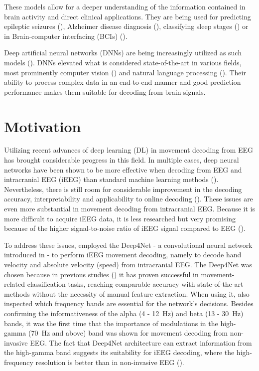 These models allow for a deeper understanding of the information contained in brain activity and direct clinical applications.
They are being used for predicting epileptic seizures (\cite{epileptic-seizures-eeg}), Alzheimer disease diagnosis (\cite{alzheimer-eeg}), classifying sleep stages (\cite{sleep-stage-alg-comparison}) or in Brain-computer interfacing (BCIs) (\cite{ecog-bci, eeg-bci}).

Deep artificial neural networks (DNNs) are being increasingly utilized as such models (\cite{Roy-2019}). DNNs elevated what is considered state-of-the-art in various fields, most prominently computer vision (\cite{dnn-computer-vision}) and natural language processing (\cite{dnn-nlp}).
Their ability to process complex data in an end-to-end manner and good prediction performance makes them suitable for decoding from brain signals. 


\section*{Motivation}
Utilizing recent advances of deep learning (DL) in movement decoding from EEG has brought considerable progress in this field.
In multiple cases, deep neural networks have been shown to be more effective when decoding from EEG and intracranial EEG (iEEG) than standard machine learning methods (\cite{Zhang-2019, lawhern-eegnet-2018, sleep-eegnet}).
Nevertheless, there is still room for considerable improvement in the decoding accuracy, interpretability and applicability to online decoding (\cite{Roy-2019}). 
These issues are even more substantial in movement decoding from intracranial EEG. 
Because it is more difficult to acquire iEEG data, it is less researched but very promising because of the higher signal-to-noise ratio of iEEG signal compared to EEG (\cite{volkova-review}). 

To address these issues, \cite{Hammer-2021} employed the Deep4Net - a convolutional neural network introduced in \cite{schirrmeister-deep-2017} - to perform iEEG movement decoding, namely to decode hand velocity and absolute velocity (speed) from intracranial EEG. 
The Deep4Net was chosen because in previous studies (\cite{schirrmeister-deep-2017, hartmann-hierarchical-2018}) it has proven successful in movement-related classification tasks, reaching comparable accuracy with state-of-the-art methods without the necessity of manual feature extraction.
When using it, \cite{schirrmeister-deep-2017} also inspected which frequency bands are essential for the network's decisions. Besides confirming the informativeness of the alpha (4 - 12~Hz) and beta (13 - 30~Hz) bands, it was the first time that the importance of modulations in the high-gamma (70~Hz and above) band was shown for movement decoding from non-invasive EEG.
The fact that Deep4Net architecture can extract information from the high-gamma band suggests its suitability for iEEG decoding, where the high-frequency resolution is better than in non-invasive EEG (\cite{gamma-eeg-bad-resolution}). 


